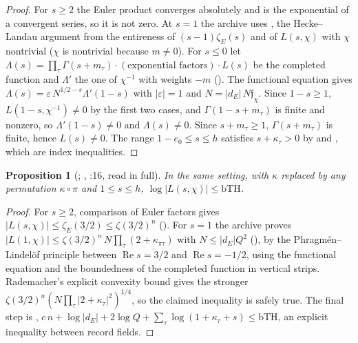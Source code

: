 \documentclass[11pt]{article}
\newtheorem{proposition}[theorem]{Proposition}
\theoremstyle{remark}
\begin{document}
\begin{proof}
For $s\ge2$ the Euler product converges absolutely and is the exponential of a convergent series, so it is not zero. At $s=1$ the archive uses , the Hecke--Landau argument from the entireness of $(s-1)\zeta_E(s)$ and of $L(s,\chi)$ with $\chi$ nontrivial ($\chi$ is nontrivial because $m\ne0$). For $s\le0$ let $\Lambda(s)=\prod_\tau\Gamma(s+m_\tau)\cdot(\text{exponential factors})\cdot L(s)$ be the completed function and $\Lambda'$ the one of $\chi^{-1}$ with weights $-m$ (). The functional equation  gives $\Lambda(s)=\varepsilon\,N^{1/2-s}\Lambda'(1-s)$ with $\lvert\varepsilon\rvert=1$ and $N=\lvert d_E\rvert\,N\mathfrak f_\chi$. Since $1-s\ge1$, $L(1-s,\chi^{-1})\ne0$ by the first two cases, and $\Gamma(1-s+m_\tau)$ is finite and nonzero, so $\Lambda'(1-s)\ne0$ and $\Lambda(s)\ne0$. Since $s+m_\tau\ge1$, $\Gamma(s+m_\tau)$ is finite, hence $L(s)\ne0$. The range $1-e_0\le s\le h$ satisfies $s+\kappa_\tau>0$ by  and , which are index inequalities.
\end{proof}

\begin{proposition}[; , :16, read in full]\label{prop:lbound}
In the same setting, with $\kappa$ replaced by any permutation $\kappa\circ\pi$ and $1\le s\le h$, $\log\lvert L(s,\chi)\rvert\le\mathrm{bTH}$.
\end{proposition}

\begin{proof}
For $s\ge2$, comparison of Euler factors gives $\lvert L(s,\chi)\rvert\le\zeta_E(3/2)\le\zeta(3/2)^n$ (). For $s=1$ the archive proves $\lvert L(1,\chi)\rvert\le\zeta(3/2)^n\,N\prod_\tau(2+\kappa_{\pi\tau})$ with $N\le\lvert d_E\rvert Q^2$ (), by the Phragm\'en--Lindel\"of principle between $\operatorname{Re}s=3/2$ and $\operatorname{Re}s=-1/2$, using the functional equation and the boundedness of the completed function in vertical strips. Rademacher's explicit convexity bound gives the stronger $\zeta(3/2)^n(N\prod_\tau\lvert2+\kappa_\tau\rvert^2)^{1/4}$, so the claimed inequality is safely true. The final step is , $c\,n+\log\lvert d_E\rvert+2\log Q+\sum_\tau\log(1+\kappa_\tau+s)\le\mathrm{bTH}$, an explicit inequality between record fields.
\end{proof}
\end{document}
